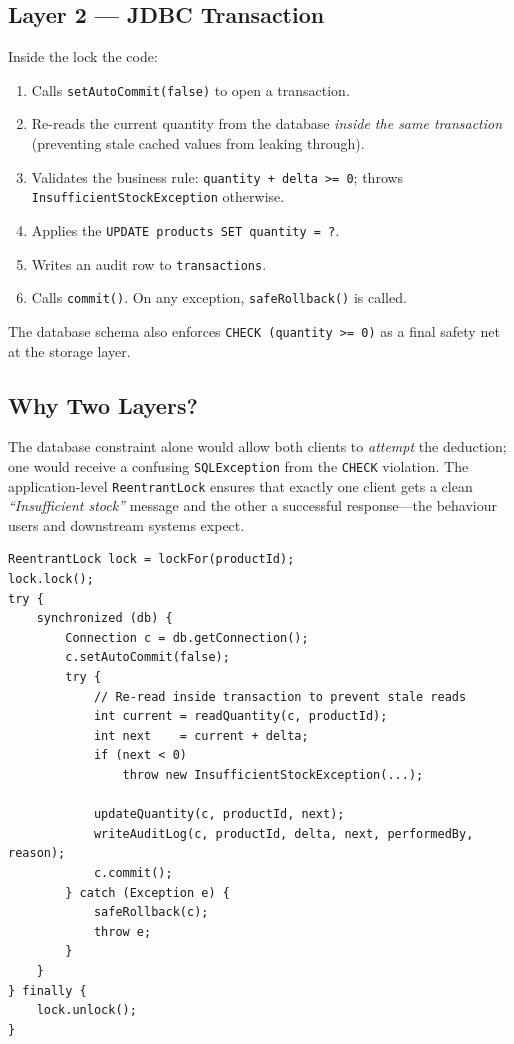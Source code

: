 \documentclass[12pt,a4paper]{article}
\begin{document}
\subsection{Layer 2 --- JDBC Transaction}

Inside the lock the code:

\begin{enumerate}[leftmargin=1.6em]
  \item Calls \texttt{setAutoCommit(false)} to open a transaction.
  \item Re-reads the current quantity from the database \emph{inside the same
        transaction} (preventing stale cached values from leaking through).
  \item Validates the business rule: \texttt{quantity + delta >= 0}; throws
        \texttt{InsufficientStockException} otherwise.
  \item Applies the \texttt{UPDATE products SET quantity = ?}.
  \item Writes an audit row to \texttt{transactions}.
  \item Calls \texttt{commit()}. On any exception, \texttt{safeRollback()} is called.
\end{enumerate}

The database schema also enforces \texttt{CHECK (quantity >= 0)} as a final
safety net at the storage layer.

\subsection{Why Two Layers?}

The database constraint alone would allow both clients to \emph{attempt} the
deduction; one would receive a confusing \texttt{SQLException} from the
\texttt{CHECK} violation. The application-level \texttt{ReentrantLock} ensures
that exactly one client gets a clean \textit{``Insufficient stock''} message and
the other a successful response---the behaviour users and downstream systems
expect.

\begin{lstlisting}[style=javastyle, caption={Core of \texttt{adjustStock()} --- two-layer concurrency guard}]
ReentrantLock lock = lockFor(productId);
lock.lock();
try {
    synchronized (db) {
        Connection c = db.getConnection();
        c.setAutoCommit(false);
        try {
            // Re-read inside transaction to prevent stale reads
            int current = readQuantity(c, productId);
            int next    = current + delta;
            if (next < 0)
                throw new InsufficientStockException(...);

            updateQuantity(c, productId, next);
            writeAuditLog(c, productId, delta, next, performedBy, reason);
            c.commit();
        } catch (Exception e) {
            safeRollback(c);
            throw e;
        }
    }
} finally {
    lock.unlock();
}
\end{lstlisting}
\end{document}

